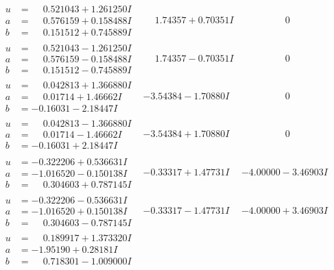 \documentclass[1p]{elsarticle_modified}
\theoremstyle{definition}
\begin{document}
$$\begin{array}{c|c|c}
\begin{aligned}
u &= \phantom{-}0.521043 + 1.261250 I \\
a &= \phantom{-}0.576159 + 0.158488 I \\
b &= \phantom{-}0.151512 + 0.745889 I\end{aligned}
 & \phantom{-}1.74357 + 0.70351 I & \phantom{-0.000000 } 0 \\ \hline\begin{aligned}
u &= \phantom{-}0.521043 - 1.261250 I \\
a &= \phantom{-}0.576159 - 0.158488 I \\
b &= \phantom{-}0.151512 - 0.745889 I\end{aligned}
 & \phantom{-}1.74357 - 0.70351 I & \phantom{-0.000000 } 0 \\ \hline\begin{aligned}
u &= \phantom{-}0.042813 + 1.366880 I \\
a &= \phantom{-}0.01714 + 1.46662 I \\
b &= -0.16031 - 2.18447 I\end{aligned}
 & -3.54384 - 1.70880 I & \phantom{-0.000000 } 0 \\ \hline\begin{aligned}
u &= \phantom{-}0.042813 - 1.366880 I \\
a &= \phantom{-}0.01714 - 1.46662 I \\
b &= -0.16031 + 2.18447 I\end{aligned}
 & -3.54384 + 1.70880 I & \phantom{-0.000000 } 0 \\ \hline\begin{aligned}
u &= -0.322206 + 0.536631 I \\
a &= -1.016520 - 0.150138 I \\
b &= \phantom{-}0.304603 + 0.787145 I\end{aligned}
 & -0.33317 + 1.47731 I & -4.00000 - 3.46903 I \\ \hline\begin{aligned}
u &= -0.322206 - 0.536631 I \\
a &= -1.016520 + 0.150138 I \\
b &= \phantom{-}0.304603 - 0.787145 I\end{aligned}
 & -0.33317 - 1.47731 I & -4.00000 + 3.46903 I \\ \hline\begin{aligned}
u &= \phantom{-}0.189917 + 1.373320 I \\
a &= -1.95190 + 0.28181 I \\
b &= \phantom{-}0.718301 - 1.009000 I\end{aligned}

\end{array}$$
\end{document}

